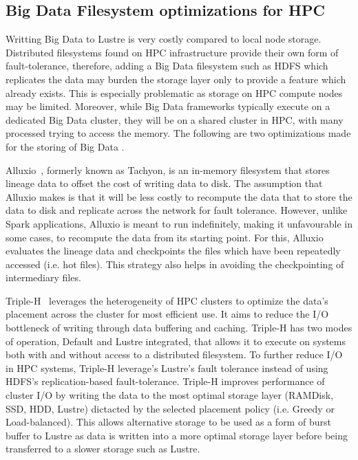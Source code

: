 \documentclass{report}
\begin{document}
            \subsection{Big Data Filesystem optimizations for HPC}

                Writting Big Data to Lustre is very costly compared to local 
                node storage. Distributed filesystems found on HPC 
                infrastructure provide their own form of fault-tolerance, 
                therefore, adding a Big Data filesystem such as HDFS which 
                replicates the data may burden the storage layer only to 
                provide a feature which already exists. This is especially 
                problematic as storage on HPC compute nodes may be limited.
                Moreover, while Big Data frameworks typically execute on a 
                dedicated Big Data cluster, they will be on a shared cluster in
                HPC, with many processed trying to access the memory. The 
                following are two optimizations made for the storing of Big Data
                .

                Alluxio~\cite{Li:2014:TRM:2670979.2670985}, 
                formerly known as Tachyon, is an in-memory filesystem
                that stores lineage data to offset the cost of writing data to 
                disk. The assumption that Alluxio makes is that it will be less
                costly to recompute the data that to store the data to disk and
                replicate across the network for fault tolerance. However,
                unlike Spark applications, Alluxio is meant to run indefinitely,
                making it unfavourable in some cases, to recompute the data
                from its starting point. For this, Alluxio evaluates the 
                lineage data and checkpoints the files which have been 
                repeatedly accessed (i.e. hot files). This strategy also helps 
                in avoiding the checkpointing of intermediary files. 

                Triple-H~\cite{7152476} leverages the heterogeneity of HPC 
                clusters to 
                optimize the data's placement across the cluster for most 
                efficient use. It aims to reduce the I/O bottleneck of writing 
                through data buffering and caching. Triple-H has two modes of
                operation, Default and Lustre integrated,
                that allows it to execute on systems both with and without 
                access to a distributed filesystem. To further reduce I/O in
                HPC systems, Triple-H leverage's Lustre's fault tolerance 
                instead of using HDFS's replication-based fault-tolerance. 
                Triple-H improves 
                performance of cluster I/O by writing the data to
                the most optimal storage layer (RAMDisk, SSD, HDD, Lustre) 
                dictacted by the selected placement policy (i.e. Greedy or 
                Load-balanced). This allows alternative storage to be used as 
                a form of burst buffer to Lustre as data is written into a more
                optimal storage layer before being transferred to a slower 
                storage such as Lustre. 
\end{document}
